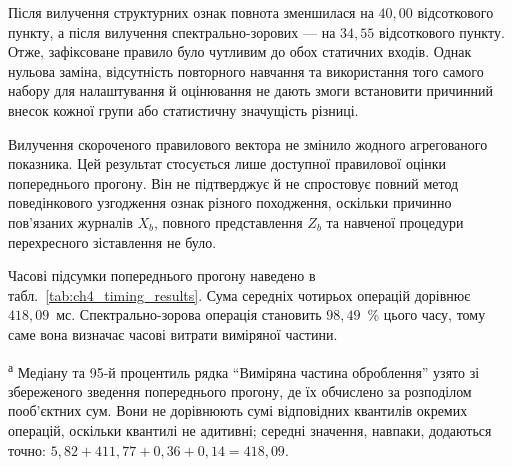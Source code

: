 Після вилучення структурних ознак повнота зменшилася на $40{,}00$ відсоткового пункту, а після вилучення спектрально-зорових --- на $34{,}55$ відсоткового пункту. Отже, зафіксоване правило було чутливим до обох статичних входів. Однак нульова заміна, відсутність повторного навчання та використання того самого набору для налаштування й оцінювання не дають змоги встановити причинний внесок кожної групи або статистичну значущість різниці.

Вилучення скороченого правилового вектора не змінило жодного агрегованого показника. Цей результат стосується лише доступної правилової оцінки попереднього прогону. Він не підтверджує й не спростовує повний метод поведінкового узгодження ознак різного походження, оскільки причинно пов’язаних журналів $X_b$, повного представлення $Z_b$ та навченої процедури перехресного зіставлення не було.

Часові підсумки попереднього прогону наведено в табл.~\ref{tab:ch4_timing_results}. Сума середніх чотирьох операцій дорівнює $418{,}09$~мс. Спектрально-зорова операція становить $98{,}49$~\% цього часу, тому саме вона визначає часові витрати виміряної частини.

\begin{table}[htbp]
\caption{Агреговане зведення часу чотирьох операцій попереднього прогону}
\label{tab:ch4_timing_results}
\centering
\small
{}

\vspace{2pt}
\parbox{0.96\textwidth}{\footnotesize \textsuperscript{а} Медіану та 95-й процентиль рядка ``Виміряна частина оброблення'' узято зі збереженого зведення попереднього прогону, де їх обчислено за розподілом пооб’єктних сум. Вони не дорівнюють сумі відповідних квантилів окремих операцій, оскільки квантилі не адитивні; середні значення, навпаки, додаються точно: $5{,}82+411{,}77+0{,}36+0{,}14=418{,}09$.}
\end{table}

